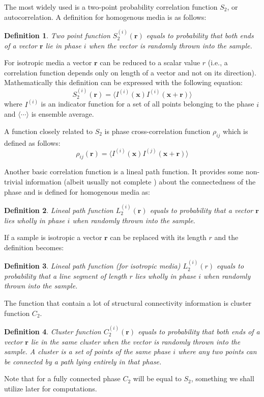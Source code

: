 \documentclass[1p]{elsarticle}
\newtheorem{definition}{Definition}
\begin{document}
The most widely used is a two-point probability correlation function $S_2$, or
autocorrelation. A definition for homogenous media is as follows:
\begin{definition}
  Two point function $S_2^{(i)}(\bm{r})$ equals to probability that both ends
  of a vector $\bm{r}$ lie in phase $i$ when the vector is randomly thrown
  into the sample.
\end{definition}
For isotropic media a vector $\bm{r}$ can be reduced to a scalar value
$r$ (i.e., a correlation function depends only on length of a vector and not on
its direction). Mathematically this definition can be expressed with the
following equation:
\begin{equation}
  S_2^{(i)}(\bm{r}) = \langle I^{(i)}(\bm{x}) I^{(i)}(\bm{x} +
  \bm{r}) \rangle
  \label{eq:s2-def}
\end{equation}
where $I^{(i)}$ is an indicator function for a set of all points belonging to
the phase $i$ and $\langle \cdots \rangle$ is ensemble average.

A function closely related to $S_2$ is phase cross-correlation function
$\rho_{ij}$ which is defined as follows:
\begin{equation}
  \rho_{ij}(\bm{r}) = \langle I^{(i)}(\bm{x}) I^{(j)}(\bm{x} +
  \bm{r}) \rangle
  \label{eq:cross-def}
\end{equation}

Another basic correlation function is a lineal path function. It provides some
non-trivial information (albeit usually not complete \cite{vcapek2011transport})
about the connectedness of the phase and is defined for homogenous media as:
\begin{definition}
  Lineal path function $L_2^{(i)}(\bm{r})$ equals to probability that a
  vector $\bm{r}$ lies wholly in phase $i$ when randomly thrown into the
  sample.
\end{definition}
If a sample is isotropic a vector $\bm{r}$ can be replaced with its length
$r$ and the definition becomes:
\begin{definition}
  Lineal path function (for isotropic media) $L_2^{(i)}(r)$ equals to
  probability that a line segment of length $r$ lies wholly in phase $i$ when
  randomly thrown into the sample.
\end{definition}

The function that contain a lot of structural connectivity information \cite{JiaoPNAS}
is cluster function $C_2$.
\begin{definition}
  Cluster function $C_2^{(i)}(\bm{r})$ equals to probability that both
  ends of a vector $\bm{r}$ lie in the same cluster when the vector is
  randomly thrown into the sample. A cluster is a set of points of the same
  phase $i$ where any two points can be connected by a path lying entirely in
  that phase.
\end{definition}
Note that for a fully connected phase $C_2$ will be equal to $S_2$, something
we shall utilize later for computations.
\end{document}
